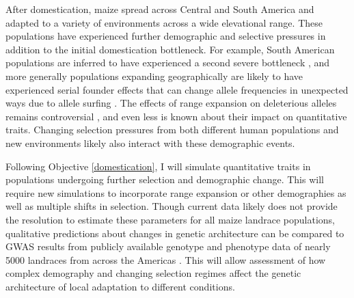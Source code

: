 After domestication, maize spread across Central and South America and adapted to a variety of environments across a wide elevational range. These populations have experienced further demographic and selective pressures in addition to the initial domestication bottleneck. For example, South American populations are inferred to have experienced a second severe bottleneck \citep{Takuno:2015eu}, and more generally populations expanding geographically are likely to have experienced serial founder effects that can change allele frequencies in unexpected ways due to allele surfing \citep{Klopfstein:2005bl}. The effects of range expansion on deleterious alleles remains controversial  \citep{Henn:2015ce, Sudmant:2015}, and even less is known about their impact on quantitative traits. Changing selection pressures from both different human populations and new environments likely also interact with these demographic events. 

Following Objective \ref{domestication}, I will simulate quantitative traits in populations undergoing further selection and demographic change. This will require new simulations to incorporate range expansion or other demographies as well as multiple shifts in selection. 
Though current data likely does not provide the resolution to estimate these parameters for all maize landrace populations, qualitative predictions about changes in genetic architecture can be compared to GWAS results from publicly available genotype and phenotype data of nearly 5000 landraces from across the Americas \citep{Hearne2015}. This will allow assessment of how complex demography and changing selection regimes affect the genetic architecture of local adaptation to different conditions. 




